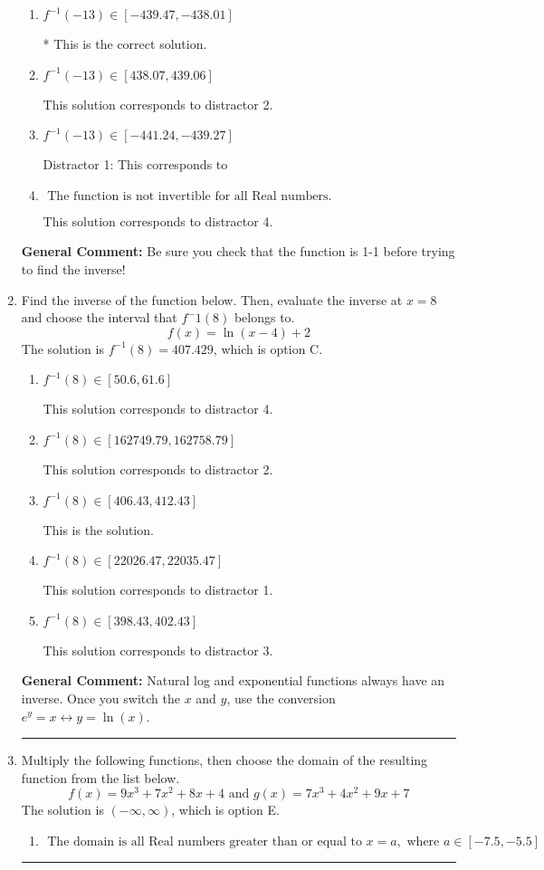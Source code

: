 \documentclass{extbook}[14pt]
\newcommand{\litem}[1]{\item #1

\rule{\textwidth}{0.4pt}}
\begin{document}
\begin{enumerate}
{\begin{enumerate}[label=\Alph*.]
 This solution corresponds to distractor 3.
\item \( f^{-1}(-13) \in [-439.47, -438.01] \)

* This is the correct solution.
\item \( f^{-1}(-13) \in [438.07, 439.06] \)

 This solution corresponds to distractor 2.
\item \( f^{-1}(-13) \in [-441.24, -439.27] \)

 Distractor 1: This corresponds to 
\item \( \text{ The function is not invertible for all Real numbers. } \)

 This solution corresponds to distractor 4.
\end{enumerate}

\textbf{General Comment:} Be sure you check that the function is 1-1 before trying to find the inverse!
}
\litem{
Find the inverse of the function below. Then, evaluate the inverse at $x = 8$ and choose the interval that $f^-1(8)$ belongs to.
\[ f(x) = \ln{(x-4)}+2 \]The solution is \( f^{-1}(8) = 407.429 \), which is option C.\begin{enumerate}[label=\Alph*.]
\item \( f^{-1}(8) \in [50.6, 61.6] \)

 This solution corresponds to distractor 4.
\item \( f^{-1}(8) \in [162749.79, 162758.79] \)

 This solution corresponds to distractor 2.
\item \( f^{-1}(8) \in [406.43, 412.43] \)

 This is the solution.
\item \( f^{-1}(8) \in [22026.47, 22035.47] \)

 This solution corresponds to distractor 1.
\item \( f^{-1}(8) \in [398.43, 402.43] \)

 This solution corresponds to distractor 3.
\end{enumerate}

\textbf{General Comment:} Natural log and exponential functions always have an inverse. Once you switch the $x$ and $y$, use the conversion $ e^y = x \leftrightarrow y=\ln(x)$.
}
\litem{
Multiply the following functions, then choose the domain of the resulting function from the list below.
\[ f(x) = 9x^{3} +7 x^{2} +8 x + 4 \text{ and } g(x) = 7x^{3} +4 x^{2} +9 x + 7 \]The solution is \( (-\infty, \infty) \), which is option E.\begin{enumerate}[label=\Alph*.]
\item \( \text{ The domain is all Real numbers greater than or equal to } x = a, \text{ where } a \in [-7.5, -5.5] \)



\end{enumerate}}
\end{enumerate}
\end{document}
